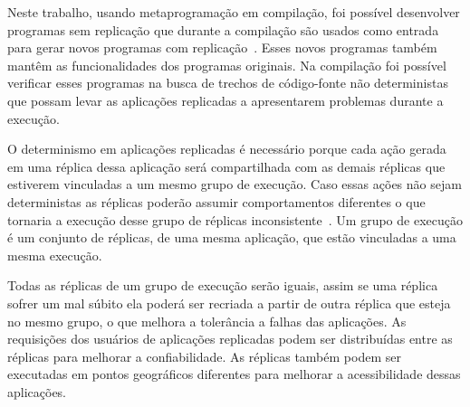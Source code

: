 \documentclass[12pt]{article}
\begin{document}
Neste trabalho, usando metaprogramação em compilação, foi possível desenvolver 
programas sem replicação que durante a compilação são usados como entrada para 
gerar novos programas com replicação~\cite{metaobject:2018}. 
Esses novos programas também mantêm as
funcionalidades dos programas originais. Na compilação  foi possível verificar
esses programas na busca de trechos de código-fonte não deterministas que possam 
levar as aplicações replicadas a apresentarem problemas durante a 
execução.

O determinismo em aplicações replicadas é necessário porque cada ação gerada em 
uma réplica dessa aplicação será compartilhada com as demais réplicas que estiverem 
vinculadas a um mesmo grupo de execução. Caso essas ações não sejam deterministas 
as réplicas poderão assumir comportamentos diferentes o que tornaria a execução 
desse grupo de réplicas inconsistente~\cite{vieira:2010}. 
Um grupo de execução é um conjunto de 
réplicas, de uma mesma aplicação, que estão vinculadas a uma mesma execução. 

Todas as réplicas de um grupo de execução serão iguais, assim se uma réplica 
sofrer um mal súbito ela poderá ser recriada a partir de outra réplica que esteja 
no mesmo grupo, o que melhora a tolerância a falhas das aplicações. As requisições 
dos usuários de aplicações replicadas podem ser distribuídas entre as réplicas 
para melhorar a confiabilidade. As réplicas também podem ser executadas em pontos 
geográficos diferentes para melhorar a acessibilidade dessas aplicações.
\end{document}
